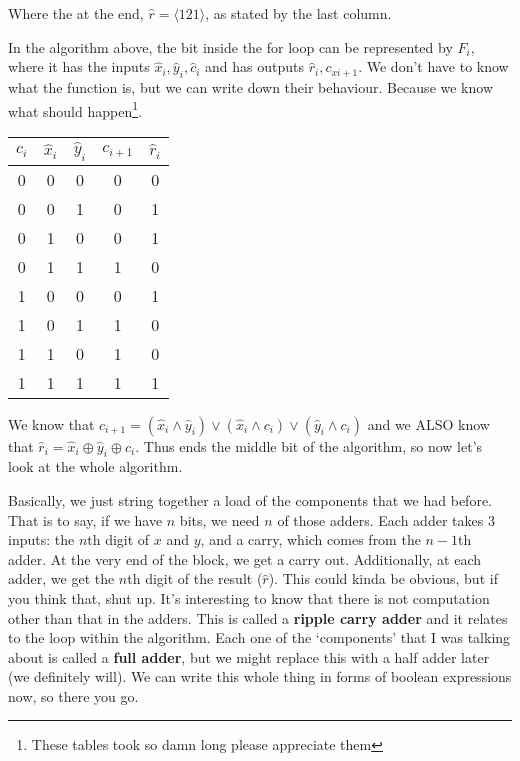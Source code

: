 \documentclass[11pt,a4paper,titlepage,dvipsnames,cmyk]{scrartcl}
\begin{document}
Where the at the end, $\hat r = \langle 1 2 1 \rangle$, as stated by the last
column.

In the algorithm above, the bit inside the for loop can be represented by
$F_i$, where it has the inputs $\hat x_i, \hat y_i, \hat c_i$ and has
outputs $\hat r_i,c_{xi+1}$. We don't have to know what the function is,
but we can write down their behaviour. Because we know what should
happen\footnote[1]{These tables took so damn long please appreciate them}.

\begin{center}
    \begin{tabular}{|c c c|c|c|}
        \hline
        $c_i$ & $\hat x_i$ & $\hat y_i$ & $c_{i+1}$ & $\hat r_i$ \\
        \hline
        0 & 0 & 0 & 0 & 0 \\
        \hline
        0 & 0 & 1 & 0 & 1 \\
        \hline
        0 & 1 & 0 & 0 & 1 \\
        \hline
        0 & 1 & 1 & 1 & 0 \\
        \hline
        1 & 0 & 0 & 0 & 1 \\
        \hline
        1 & 0 & 1 & 1 & 0 \\
        \hline
        1 & 1 & 0 & 1 & 0 \\
        \hline
        1 & 1 & 1 & 1 & 1 \\
        \hline
    \end{tabular}
\end{center}

We know that $c_{i+1} = (\hat x_i \wedge \hat y_i) \vee (\hat x_i \wedge c_i)
\vee (\hat y_i \wedge c_i)$ and we ALSO know that $\hat r_i = \hat x_i \oplus
\hat y_i \oplus c_i$. Thus ends the middle bit of the algorithm, so now let's
look at the whole algorithm.

Basically, we just string together a load of the components that we had before.
That is to say, if we have $n$ bits, we need $n$ of those adders. Each adder
takes 3 inputs: the $n$th digit of $x$ and $y$, and a carry, which comes from
the $n-1$th adder. At the very end of the block, we get a carry out.
Additionally, at each adder, we get the $n$th digit of the result ($\hat r$).
This could kinda be obvious, but if you think that, shut up. It's interesting to
know that there is not computation other than that in the adders. This is called
a \textbf{ripple carry adder} and it relates to the loop within the algorithm.
Each one of the `components' that I was talking about is called a \textbf{full
adder}, but we might replace this with a half adder later (we definitely will).
We can write this whole thing in forms of boolean expressions now, so there you
go.
\end{document}
